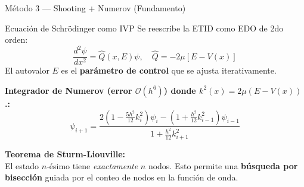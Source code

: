 \documentclass[aspectratio=169,10pt]{beamer}
\begin{document}
\begin{frame}{Método 3 — Shooting + Numerov (Fundamento)}

\begin{physbox}{Ecuación de Schrödinger como IVP}
Se reescribe la ETID como EDO de 2do orden:
\[
  \frac{d^2\psi}{dx^2} = \hat{Q}(x,E)\psi,\quad \hat{Q} = -2\mu[E-V(x)]
\]
El autovalor $E$ es el \textbf{parámetro de control} que se ajusta iterativamente.
\end{physbox}

\vspace{0.4cm}

\textbf{Integrador de Numerov (error $\mathcal{O}(h^6)$) donde $k^2(x) = 2\mu(E-V(x))$.:}
\[
  \psi_{i+1} = \frac{2(1-\frac{5h^2}{12}k_i^2)\psi_i - (1+\frac{h^2}{12}k_{i-1}^2)\psi_{i-1}}{1+\frac{h^2}{12}k_{i+1}^2}
\]


\vspace{0.4cm}

\textbf{Teorema de Sturm-Liouville:}\\
El estado $n$-ésimo tiene \emph{exactamente} $n$ nodos. Esto permite una \textbf{búsqueda por bisección} guiada por el conteo de nodos en la función de onda.

\end{frame}
\end{document}
